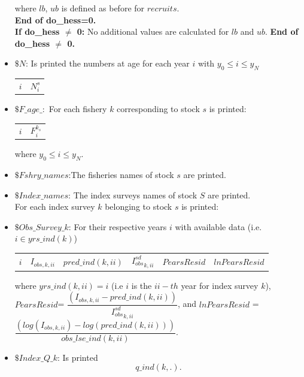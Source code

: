 \documentclass{article}
\begin{document}
\begin{itemize}
\begin{center}
\begin{tabular}{c c c c c}
    \end{tabular}
\end{center}
where $lb$, $ub$ is defined as before for $recruits$.\\

\textbf{End of do\_hess=0.}\\

\textbf{If do\_hess $\neq$ 0:} No additional values are calculated for $lb$ and $ub$. \textbf{End of do\_hess $\neq$ 0.}\\

\item $\$ N$: Is printed the numbers at age for each year $i$ with $y_0\leq i \leq y_N$

\begin{center}
    \begin{tabular}{c c}
        $i$ & $N^s_{i}$ \\
    \end{tabular}
\end{center}

\item $\$ F\_age\_:$ For each fishery $k$ corresponding to stock $s$ is printed:
\begin{center}
    \begin{tabular}{c c}
        $i$ & $F^{k_s}_i$ \\
    \end{tabular}
\end{center}
where $y_0\leq i \leq y_N$.
   
\item $\$ Fshry\_names$:The  fisheries names of stock $s$ are printed.

\item $\$ Index\_names$: The index surveys names of stock $S$ are printed.\\

For each index survey $k$ belonging to stock $s$ is printed:\\

\item $\$ Obs\_Survey\_k$: For their respective years $i$ with available data (i.e. $i\in yrs\_ind(k)$)
\begin{center}
\begin{tabular}{c c c c c c}
  $i$ &  $I_{obs,k,ii}$ & $pred\_ind(k,ii)$ & ${I_{obs}^{sd}}_{k,ii}$ & $PearsResid$ & $lnPearsResid$  \\
\end{tabular}
\end{center}
where $yrs\_ind(k,ii)=i$ (i.e $i$ is the $ii-th$ year for index survey $k$), \\ $PearsResid$= $\dfrac{(I_{obs,k,ii}-pred\_ind(k,ii))}{{I_{obs}^{sd}}_{k,ii}} $, and 
$lnPearsResid$ =  $\dfrac{(log(I_{obs,k,ii})-log(pred\_ind(k,ii)))}{obs\_lse\_ind(k,ii) }$.
\item $\$ Index\_Q\_k$: Is printed 
\begin{equation}
    q\_ind(k,.).
\end{equation}


\end{itemize}
\end{document}
